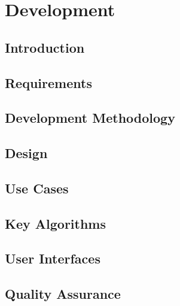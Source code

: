 \chapter{Development}
\section{Introduction}

\section{Requirements}

\section{Development Methodology}

\section{Design}




\section{Use Cases}

\section{Key Algorithms}

\section{User Interfaces}

\section{Quality Assurance}

